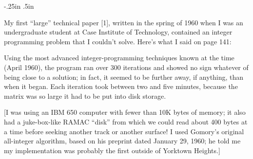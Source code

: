 \nopagenumbers
\advance{}
\hoffset-.25in
\vglue.5in

\medskip
\noindent
My first ``large'' technical paper [1], written in the spring of 1960
when I was an undergraduate student at Case Institute of Technology,
contained an integer programming problem that I couldn't solve.
Here's what I said on page 141:

{\smallskip\narrower\noindent
Using the most advanced integer-programming techniques known at the time
(April 1960), the program ran over 300 iterations and showed no sign whatever
of being close to a solution; in fact, it seemed to be further away, if
anything, than when it began. Each iteration took between two and five
minutes, because the matrix was so large it had to be put into disk storage.
\smallskip}

[I was using an IBM 650 computer with fewer than 10K bytes of memory; it also
had a juke-box-like RAMAC ``disk'' from which we could read about 400 bytes
at a time before seeking another track or another surface! I used Gomory's
original all-integer algorithm, based on his preprint dated January 29,
1960; he told me my implementation was probably the first outside of
Yorktown Heights.]

